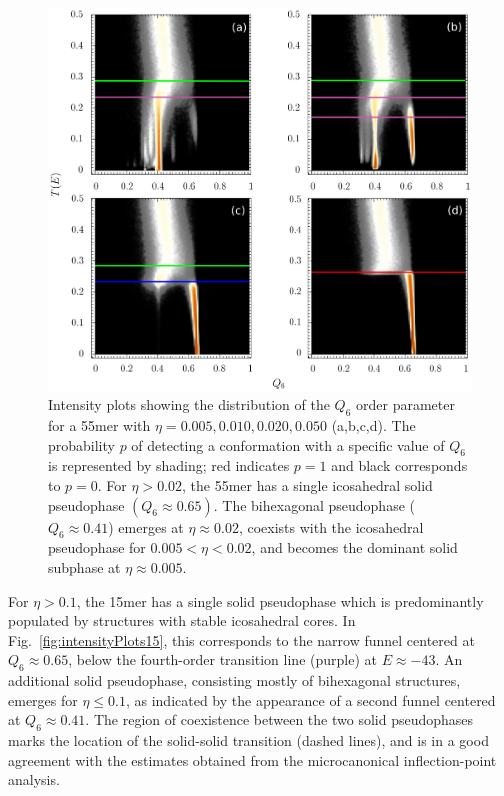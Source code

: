 \documentclass[12pt]{report}
\begin{document}
\begin{figure}
\center
\includegraphics[width=\textwidth]{chapter6Figs/structuralAnalysis55.eps}
	\caption{\label{fig:intensityPlots55}Intensity plots showing the distribution of the 
$Q_{6}$ order parameter for a 55mer with $\eta = 0.005, 0.010, 0.020, 0.050$ (a,b,c,d). The probability $p$ of detecting a conformation with a specific value of $Q_{6}$ is represented by shading; red indicates $p=1$ and black corresponds to $p=0$. For $\eta > 0.02$, the 55mer has a single icosahedral solid pseudophase $(Q_{6} \approx 0.65)$. The bihexagonal pseudophase  ($Q_{6} \approx 0.41$) emerges at $\eta \approx 0.02$, coexists with the icosahedral pseudophase for $0.005 < \eta < 0.02$, and becomes the dominant solid subphase at $\eta \approx 0.005$.}
\end{figure}
%

%
For $\eta > 0.1$, the 15mer has a single solid pseudophase which is predominantly populated by structures with stable icosahedral cores. In Fig.~\ref{fig:intensityPlots15}, this corresponds to the narrow funnel centered at $Q_{6} \approx 0.65$, below the fourth-order transition line (purple) at $E \approx -43$. An additional solid pseudophase, consisting mostly of bihexagonal structures, emerges for $\eta \leq 0.1$, as indicated by the appearance of a second funnel centered at $Q_{6} \approx 0.41$. The region of coexistence between the two solid pseudophases marks the location of the solid-solid transition (dashed lines), and is in a good agreement with the estimates obtained from the microcanonical inflection-point analysis. 
%
\end{document}
